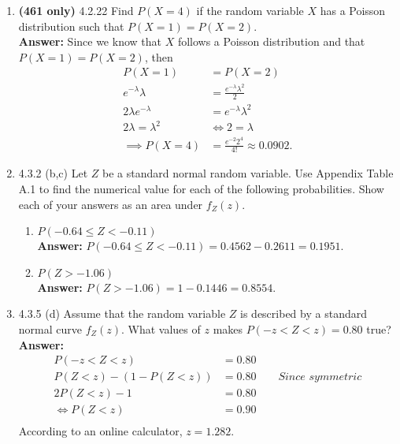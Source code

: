 \documentclass{article}
\begin{document}
\begin{enumerate}
        \item \textbf{(461 only) }4.2.22 Find $P(X=4)$ if the random variable $X$ has a Poisson distribution such that $P(X=1) = P(X=2)$.\\
        \textbf{Answer: }Since we know that $X$ follows a Poisson distribution and that $P(X=1)=P(X=2)$, then
            \begin{align*}
                P(X=1) &= P(X=2)\\
                e^{-\lambda}\lambda &= \frac{e^{-\lambda} \lambda^2}{2}\\
                2\lambda e^{-\lambda} &= e^{-\lambda}\lambda^2\\
                2\lambda = \lambda^2 &\iff 2=\lambda\\
                \implies P(X=4) &= \frac{e^{-2}2^4}{4!} \approx 0.0902.
            \end{align*}
        
        \item 4.3.2 (b,c)  Let $Z$ be a standard normal random variable. Use Appendix Table A.1 to find the numerical value for each of the following probabilities. Show each of your answers as an area under $f_Z(z)$.
        \begin{enumerate}
            \item $P(-0.64 \leq Z < -0.11)$\\
            \textbf{Answer: }$P(-0.64 \leq Z < -0.11) = 0.4562-0.2611 = 0.1951$.
            
            \item$ P(Z > -1.06)$\\
            \textbf{Answer: }$P(Z > -1.06) = 1-0.1446 = 0.8554$.
        \end{enumerate}
        
        \item 4.3.5 (d) Assume that the random variable $Z$ is described by a standard normal curve $f_Z(z)$. What values of $z$ makes $P(-z < Z < z) = 0.80$ true?\\
        \textbf{Answer: }
            \begin{align*}
                P(-z < Z < z) &= 0.80\\
                P(Z < z) - (1-P(Z < z)) &= 0.80    \qquad \textit{Since symmetric}\\
                2P(Z < z) -1 &= 0.80\\
                \iff P(Z < z) &= 0.90\\
            \end{align*}
        According to an online calculator, $z=1.282$.\\
        

\end{enumerate}
\end{document}
